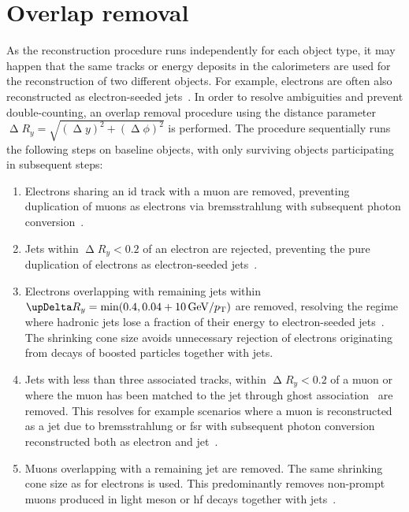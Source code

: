 \section{Overlap removal}\label{sec:overlap_removal}

As the reconstruction procedure runs independently for each object type, it may happen that the same tracks or energy deposits in the calorimeters are used for the reconstruction of two different objects. For example, electrons are often also reconstructed as electron-seeded jets~\cite{overlapremoval:1700874}. In order to resolve ambiguities and prevent double-counting, an overlap removal procedure using the distance parameter $\upDelta R_y = \sqrt{(\upDelta y)^2+(\upDelta \phi)^2}$ is performed. The procedure sequentially runs the following steps on baseline objects, with only surviving objects participating in subsequent steps:
\begin{enumerate}
	\item Electrons sharing an \gls{id} track with a muon are removed, preventing duplication of muons as electrons via bremsstrahlung with subsequent photon conversion~\cite{overlapremoval:1700874}.
	\item Jets within $\upDelta R_y < 0.2$ of an electron are rejected, preventing the pure duplication of electrons as electron-seeded jets~\cite{overlapremoval:1700874}.
	\item Electrons overlapping with remaining jets within $\upDelta R_y = \min (0.4, 0.04+\SI{10}{\GeV}/\pt)$ are removed, resolving the regime where hadronic jets lose a fraction of their energy to electron-seeded jets~\cite{overlapremoval:1700874}. The shrinking cone size avoids unnecessary rejection of electrons originating from decays of boosted particles together with jets.
	\item Jets with less than three associated tracks, within $\upDelta R_y < 0.2$ of a muon or where the muon has been matched to the jet through ghost association~\cite{ghostassociation:2008gn} are removed. This resolves for example scenarios where a muon is reconstructed as a jet due to bremsstrahlung or \gls{fsr} with subsequent photon conversion reconstructed both as electron and jet~\cite{overlapremoval:1700874}.
	\item Muons overlapping with a remaining jet are removed. The same shrinking cone size as for electrons is used. This predominantly removes non-prompt muons produced in light meson or \gls{hf} decays together with jets~\cite{overlapremoval:1700874}. 
\end{enumerate} 



